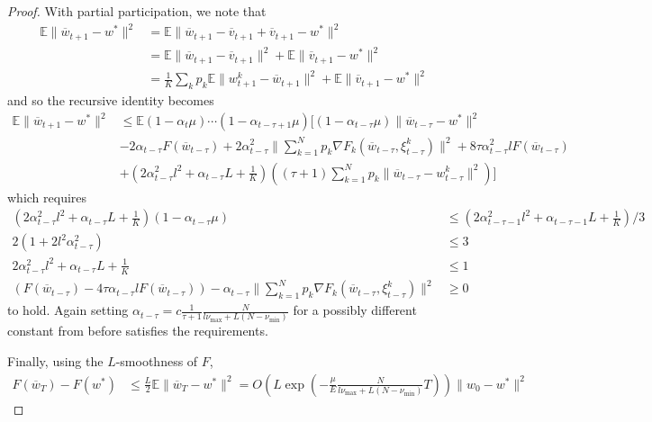 \begin{proof}
	With partial participation, we note that 
	\begin{align*}
	\mathbb{E}\|\overline{w}_{t+1}-w^{\ast}\|^{2} & =\mathbb{E}\|\overline{w}_{t+1}-\overline{v}_{t+1}+\overline{v}_{t+1}-w^{\ast}\|^{2}\\
	& =\mathbb{E}\|\overline{w}_{t+1}-\overline{v}_{t+1}\|^{2}+\mathbb{E}\|\overline{v}_{t+1}-w^{\ast}\|^{2}\\
	& =\frac{1}{K}\sum_{k}p_{k}\mathbb{E}\|w_{t+1}^{k}-\overline{w}_{t+1}\|^{2}+\mathbb{E}\|\overline{v}_{t+1}-w^{\ast}\|^{2}
	\end{align*}
	and so the recursive identity becomes 
	\begin{align*}
	\mathbb{E}\|\overline{w}_{t+1}-w^{\ast}\|^{2} & \leq\mathbb{E}(1-\alpha_{t}\mu)\cdots(1-\alpha_{t-\tau+1}\mu)[(1-\alpha_{t-\tau}\mu)\|\overline{w}_{t-\tau}-w^{\ast}\|^{2}\\
	& -2\alpha_{t-\tau}F(\overline{w}_{t-\tau})+2\alpha_{t-\tau}^{2}\|\sum_{k=1}^{N}p_{k}\nabla F_{k}(\overline{w}_{t-\tau},\xi_{t-\tau}^{k})\|^{2}+8\tau\alpha_{t-\tau}^{2}lF(\overline{w}_{t-\tau})\\
	& +(2\alpha_{t-\tau}^{2}l^{2}+\alpha_{t-\tau}L+\frac{1}{K})((\tau+1)\sum_{k=1}^{N}p_{k}\|\overline{w}_{t-\tau}-w_{t-\tau}^{k}\|^{2})]
	\end{align*}
	which requires 
	\begin{align*}
	(2\alpha_{t-\tau}^{2}l^{2}+\alpha_{t-\tau}L+\frac{1}{K})(1-\alpha_{t-\tau}\mu) & \leq(2\alpha_{t-\tau-1}^{2}l^{2}+\alpha_{t-\tau-1}L+\frac{1}{K})/3\\
	2(1+2l^{2}\alpha_{t-\tau}^{2}) & \leq3\\
	2\alpha_{t-\tau}^{2}l^{2}+\alpha_{t-\tau}L+\frac{1}{K} & \leq1\\
	(F(\overline{w}_{t-\tau})-4\tau\alpha_{t-\tau}lF(\overline{w}_{t-\tau}))-\alpha_{t-\tau}\|\sum_{k=1}^{N}p_{k}\nabla F_{k}(\overline{w}_{t-\tau},\xi_{t-\tau}^{k})\|^{2} & \geq0
	\end{align*}
	to hold. Again setting $\alpha_{t-\tau}=c\frac{1}{\tau+1}\frac{N}{l\nu_{\max}+L(N-\nu_{\min})}$
	for a possibly different constant from before satisfies the requirements.
	
	Finally, using the $L$-smoothness of $F$, 
	\begin{align*}
	F(\overline{w}_{T})-F(w^{\ast}) & \leq\frac{L}{2}\mathbb{E}\|\overline{w}_{T}-w^{\ast}\|^{2}=O(L\exp(-\frac{\mu}{E}\frac{N}{l\nu_{\max}+L(N-\nu_{\min})}T))\|w_{0}-w^{\ast}\|^{2}
	\end{align*}
\end{proof}

